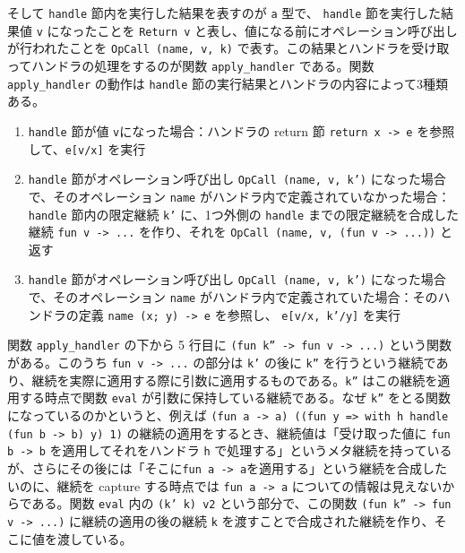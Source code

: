 そして \texttt{handle} 節内を実行した結果を表すのが \texttt{a} 型で、 \texttt{handle} 節を実行した結果値 \texttt{v} になったことを \texttt{Return v} と表し、値になる前にオペレーション呼び出しが行われたことを \texttt{OpCall (name, v, k)} で表す。この結果とハンドラを受け取ってハンドラの処理をするのが関数 \texttt{apply\_handler} である。関数 \texttt{apply\_handler} の動作は \texttt{handle} 節の実行結果とハンドラの内容によって3種類ある。

\begin{enumerate}
\item \texttt{handle} 節が値 \texttt{v}になった場合：ハンドラの return 節 \texttt{return x -> e} を参照して、\texttt{e[v/x]} を実行
\item \texttt{handle} 節がオペレーション呼び出し \texttt{OpCall (name, v, k')} になった場合で、そのオペレーション \texttt{name} がハンドラ内で定義されていなかった場合：\texttt{handle} 節内の限定継続 \texttt{k'} に、1つ外側の \texttt{handle} までの限定継続を合成した継続 \texttt{fun v -> ...} を作り、それを \texttt{OpCall (name, v, (fun v -> ...))} と返す
\item \texttt{handle} 節がオペレーション呼び出し \texttt{OpCall (name, v, k')} になった場合で、そのオペレーション \texttt{name} がハンドラ内で定義されていた場合：そのハンドラの定義 \texttt{name (x; y) -> e} を参照し、 \texttt{e[v/x, k'/y]} を実行
\end{enumerate}

関数 \texttt{apply\_handler} の下から 5 行目に \texttt{(fun k'' -> fun v -> ...)} という関数がある。このうち \texttt{fun v -> ...} の部分は \texttt{k'} の後に \texttt{k''} を行うという継続であり、継続を実際に適用する際に引数に適用するものである。\texttt{k''} はこの継続を適用する時点で関数 \texttt{eval} が引数に保持している継続である。なぜ \texttt{k''} をとる関数になっているのかというと、例えば \texttt{(fun a -> a) ((fun y => with h handle (fun b -> b) y) 1)} の継続の適用をするとき、継続値は「受け取った値に \texttt{fun b -> b} を適用してそれをハンドラ \texttt{h} で処理する」というメタ継続を持っているが、さらにその後には「そこに\texttt{fun a -> a}を適用する」という継続を合成したいのに、継続を capture する時点では \texttt{fun a -> a} についての情報は見えないからである。関数 \texttt{eval} 内の \texttt{(k' k) v2} という部分で、この関数 \texttt{(fun k'' -> fun v -> ...)} に継続の適用の後の継続 \texttt{k} を渡すことで合成された継続を作り、そこに値を渡している。
